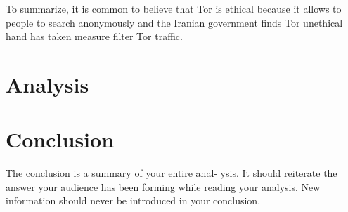 \documentclass[11pt]{article}
\begin{document}
\begin{multicols}{2}
To summarize, it is common to believe that Tor is ethical because it allows to
people to search anonymously and the Iranian government finds Tor unethical hand
has taken measure filter Tor traffic.




\section{Analysis} 


\section{Conclusion} The conclusion is a summary of your entire anal- ysis. It
should reiterate the answer your audience has been forming while reading your
analysis. New information should never be introduced in your conclusion.
\cite{texTemp}

\end{multicols} \newpage

\nocite{*}




\end{document}
